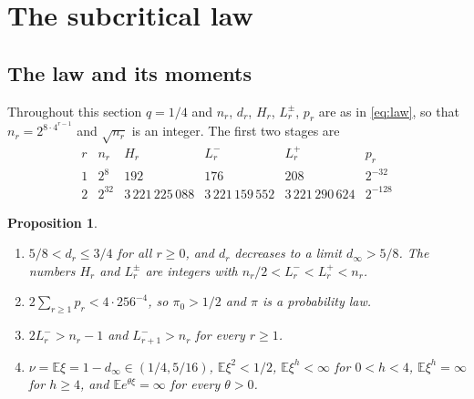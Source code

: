 \documentclass[11pt]{amsart}
\newtheorem{proposition}[theorem]{Proposition}
\theoremstyle{definition}
\newcommand{\E}{\mathbb{E}}
\begin{document}
\section{The subcritical law}\label{sec:sub}

\subsection{The law and its moments}

Throughout this section $q=1/4$ and $n_r$, $d_r$, $H_r$, $L_r^\pm$, $p_r$ are as in \eqref{eq:law}, so that $n_r=2^{8\cdot4^{r-1}}$ and $\sqrt{n_r}$ is an integer. The first two stages are
\[
\begin{array}{c|c|c|c|c|c}
r & n_r & H_r & L_r^- & L_r^+ & p_r\\ \hline
1 & 2^{8} & 192 & 176 & 208 & 2^{-32}\\
2 & 2^{32} & 3\,221\,225\,088 & 3\,221\,159\,552 & 3\,221\,290\,624 & 2^{-128}
\end{array}
\]

\begin{proposition}\label{prop:law}
\begin{enumerate}
\item[(a)] $5/8<d_r\le3/4$ for all $r\ge0$, and $d_r$ decreases to a limit $d_\infty>5/8$. The numbers $H_r$ and $L_r^\pm$ are integers with $n_r/2<L_r^-<L_r^+<n_r$.
\item[(b)] $2\sum_{r\ge1}p_r<4\cdot256^{-4}$, so $\pi_0>1/2$ and $\pi$ is a probability law.
\item[(c)] $2L_r^->n_r-1$ and $L_{r+1}^->n_r$ for every $r\ge1$.
\item[(d)] $\nu=\E\xi=1-d_\infty\in(1/4,5/16)$, $\E\xi^2<1/2$, $\E\xi^h<\infty$ for $0<h<4$, $\E\xi^h=\infty$ for $h\ge4$, and $\E e^{\theta\xi}=\infty$ for every $\theta>0$.
\end{enumerate}
\end{proposition}
\end{document}
